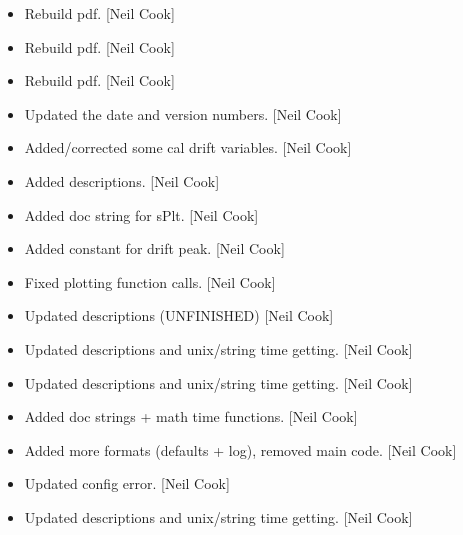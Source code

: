 \documentclass[a4paper,10pt,english]{report}
\begin{document}
\begin{itemize}
\item {} 
Rebuild pdf. {[}Neil Cook{]}

\item {} 
Rebuild pdf. {[}Neil Cook{]}

\item {} 
Rebuild pdf. {[}Neil Cook{]}

\item {} 
Updated the date and version numbers. {[}Neil Cook{]}

\item {} 
Added/corrected some cal drift variables. {[}Neil Cook{]}

\item {} 
Added descriptions. {[}Neil Cook{]}

\item {} 
Added doc string for sPlt. {[}Neil Cook{]}

\item {} 
Added constant for drift peak. {[}Neil Cook{]}

\item {} 
Fixed plotting function calls. {[}Neil Cook{]}

\item {} 
Updated descriptions (UNFINISHED) {[}Neil Cook{]}

\item {} 
Updated descriptions and unix/string time getting. {[}Neil Cook{]}

\item {} 
Updated descriptions and unix/string time getting. {[}Neil Cook{]}

\item {} 
Added doc strings + math time functions. {[}Neil Cook{]}

\item {} 
Added more formats (defaults + log), removed main code. {[}Neil Cook{]}

\item {} 
Updated config error. {[}Neil Cook{]}

\item {} 
Updated descriptions and unix/string time getting. {[}Neil Cook{]}

\end{itemize}
\end{document}
